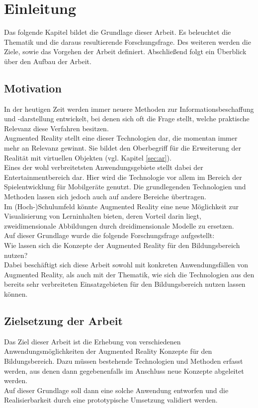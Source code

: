 \chapter{Einleitung}\label{chapter:einleitung}
Das folgende Kapitel bildet die Grundlage dieser Arbeit. Es beleuchtet die Thematik und die daraus resultierende Forschungsfrage. Des weiteren werden die Ziele, sowie das Vorgehen der Arbeit definiert. Abschließend folgt ein Überblick über den Aufbau der Arbeit.

\section{Motivation}\label{sec:motivation}
In der heutigen Zeit werden immer neuere Methoden zur Informationsbeschaffung und -darstellung entwickelt, bei denen sich oft die Frage stellt, welche praktische Relevanz diese Verfahren besitzen. \\
Augmented Reality stellt eine dieser Technologien dar, die momentan immer mehr an Relevanz gewinnt. Sie bildet den Oberbegriff für die Erweiterung der Realität mit virtuellen Objekten (vgl. Kapitel \ref{sec:ar}). \\
Eines der wohl verbreitetsten Anwendungsgebiete stellt dabei der Entertainmentbereich dar. Hier wird die Technologie vor allem im Bereich der Spielentwicklung für Mobilgeräte genutzt. Die grundlegenden Technologien und Methoden lassen sich jedoch auch auf andere Bereiche übertragen. \\
Im (Hoch-)Schulumfeld könnte Augmented Reality eine neue Möglichkeit zur Visualisierung von Lerninhalten bieten, deren Vorteil darin liegt, zweidimensionale Abbildungen durch dreidimensionale Modelle zu ersetzen. \\
Auf dieser Grundlage wurde die folgende Forschungsfrage aufgestellt:\\
\glqq Wie lassen sich die Konzepte der Augmented Reality für den Bildungsbereich nutzen?\grqq \\
Dabei beschäftigt sich diese Arbeit sowohl mit konkreten Anwendungsfällen von Augmented Reality, als auch mit der Thematik, wie sich die Technologien aus den bereits sehr verbreiteten Einsatzgebieten für den Bildungsbereich nutzen lassen können. \\


\section{Zielsetzung der Arbeit}\label{sec:ziele}
Das Ziel dieser Arbeit ist die Erhebung von verschiedenen Anwendungsmöglichkeiten der Augmented Reality Konzepte für den Bildungsbereich. Dazu müssen bestehende Technologien und Methoden erfasst werden, aus denen dann gegebenenfalls im Anschluss neue Konzepte abgeleitet werden. \\
Auf dieser Grundlage soll dann eine solche Anwendung entworfen und die Realisierbarkeit durch eine prototypische Umsetzung validiert werden. 

